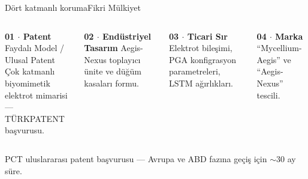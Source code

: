 \documentclass[aspectratio=169,11pt]{beamer}
\begin{document}
\begin{frame}{D\"ort katmanl{\i} koruma}{Fikri M\"ulkiyet}
  \begin{columns}[T]
      \begin{block}{\textbf{01 \(\cdot\) Patent}}
        Faydal{\i} Model / Ulusal Patent\\
        {\scriptsize \c{C}ok katmanl{\i} biyomimetik elektrot mimarisi --- T\"URKPATENT ba\c{s}vurusu.}
      \end{block}
      \vskip4pt
      \begin{block}{\textbf{02 \(\cdot\) End\"ustriyel Tasar{\i}m}}
        Aegis-Nexus toplay{\i}c{\i} \"unite ve d\"u\u{g}\"um kasalar{\i} formu.
      \end{block}
      \begin{block}{\textbf{03 \(\cdot\) Ticari S{\i}r}}
        Elektrot bile\c{s}imi, PGA konfigrasyon parametreleri, LSTM a\u{g}{\i}rl{\i}klar{\i}.
      \end{block}
      \vskip4pt
      \begin{block}{\textbf{04 \(\cdot\) Marka}}
        ``Mycellium-Aegis'' ve ``Aegis-Nexus'' tescili.
      \end{block}
  \end{columns}
  \vskip8pt
  {\footnotesize\color{sage} PCT uluslararas{\i} patent ba\c{s}vurusu --- Avrupa ve ABD faz{\i}na ge\c{c}i\c{s} i\c{c}in $\sim$30 ay s\"ure.}
\end{frame}
\end{document}
